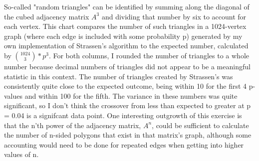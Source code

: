 \documentclass[11pt]{article}
\begin{document}
So-called "random triangles" can be identified by summing along the diagonal of the cubed adjacency matrix $A^3$ and dividing that number by six to account for each vertex. This chart compares the number of such triangles in a 1024-vertex graph (where each edge is included with some probability p) generated by my own implementation of Strassen's algorithm to the expected number, calculated by ${1024 \choose 3} * p^3$. For both columns, I rounded the number of triangles to a whole number because decimal numbers of triangles did not appear to be a meaningful statistic in this context. The number of triangles created by Strassen's was consistently quite close to the expected outcome, being within 10 for the first 4 p-values and within 100 for the fifth. The variance in these numbers was quite significant, so I don't think the crossover from less than expected to greater at p = 0.04 is a signifcant data point. One interesting outgrowth of this exercise is that the n'th power of the adjacency matrix, $A^n$, could be sufficient to calculate the number of n-sided polygons that exist in that matrix's graph, although some accounting would need to be done for repeated edges when getting into higher values of n.  \\\\
\end{document}
